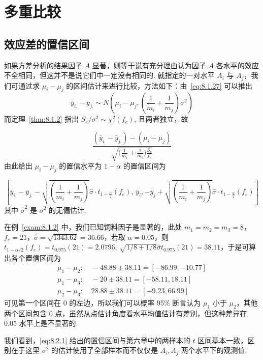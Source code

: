 \section{多重比较}\label{sec:8.2}
\subsection{效应差的置信区间} \label{ssec:8.2.1}
如果方差分析的结果因子 $A$ 显著，则等于说有充分理由认为因子 $A$ 各水平的效应不全相同，但这并不是说它们中一定没有相同的. 就指定的一对水平 $A_i$ 与 $A_j$，我们可通过求 $\mu_i - \mu_j$ 的区间估计来进行比较，方法如下：由~\eqref{eq:8.1.27} 可以推出
\begin{equation*}
  \bar{y}_{i.} - \bar{y}_{j.} \sim N \left(\mu_{i}-\mu_{j},\left(\frac{1}{m_{i}}+\frac{1}{m_{j}}\right) \sigma^{2}\right)
\end{equation*}
而定理~\ref{thm:8.1.2} 指出 $S_e/\sigma^2 \sim \chi^2(f_e)$, 且两者独立，故

\begin{equation*}
  \frac{(\bar{y}_{i.} - \bar{y}_{j.}) - (\mu_i - \mu_j) }{\sqrt{\big(\frac{1}{m_i} + \frac{1}{m_i}\big) \frac{S_e}{f_e}}}
\end{equation*}
由此给出 $\mu_i -\mu_j$ 的置信水平为 $1-\alpha$ 的置信区间为

\begin{equation}\label{eq:8.2.1}
  \left[\bar{y}_{i.}-\bar{y}_{j.}-\sqrt{\left(\frac{1}{m_{i}}+\frac{1}{m_{j}}\right)} \hat{\sigma} \cdot t_{1-\frac{\alpha}{2}}\left(f_{e}\right),\,\bar{y}_{i},-\bar{y}_{j}+\sqrt{\left(\frac{1}{m_{i}}+\frac{1}{m_{j}}\right)} \hat{\sigma} \cdot t_{1-\frac{\alpha}{2}}\left(f_{e}\right)\right]
\end{equation}
其中 $\hat{\sigma}^2$ 是 $\sigma^2$ 的无偏估计.

\begin{example}\label{exam:8.2.1}
在例~\ref{exam:8.1.2} 中，我们已知饲料因子是显著的，此处 $m_1=m_2=
m_3 = 8$，$f_e = 21$，$\hat{\sigma}=\sqrt{1343.62} = 36.66$，若取 $\alpha=0.05$，则 $t_{1-\alpha/2}(f_e)=
t_{0.975}(21) = 2.0796$, $\sqrt{1/8+1/8} \hat{\sigma} t_{0.975}(21) = 38.11$，于是可算出各个置信区闻为
\begin{align*} 
\mu_{1}-\mu_{2} : &\; -48.88 \pm 38.11=[-86.99,-10.77] \\ 
\mu_{1}-\mu_{3} : &\; -20 \pm 38.11=[-58.11,18.11] \\ 
\mu_{2}-\mu_{3} : &\; 28.88 \pm 38.11=[-9.23,66.99] 
\end{align*}
可见第一个区间在 0 的左边，所以我们可以概率 95\% 断言认为 $\mu_1$ 小于 $\mu_2$，其他两个区间包含 0 点，虽然从点估计角度看水平均值估计有差别，但这种差异在 0.05 水平上是不显著的.

我们看到，\eqref{eq:8.2.1} 给出的置信区间与第六章中的两样本的 $t$ 区间基本一致，区别在于这里 $\sigma^2$ 的估计使用了全部样本而不仅仅是 $A_i, A_j$ 两个水平下的观测值.
\end{example}

